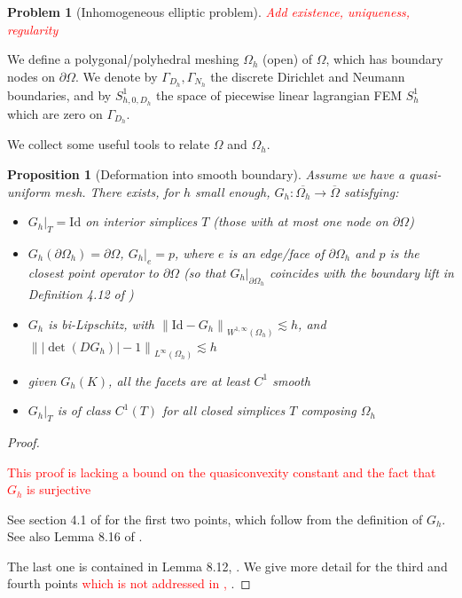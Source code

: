 \documentclass[english,a4paper,9pt,oneside]{scrbook}	%
\theoremstyle{break}
\newtheorem{prop}[equation]{Proposition}
\newtheorem{pb}[equation]{Problem}
\newenvironment{mproof}[1][\proofname]{%
  \begin{proof}[#1]$ $\par\nobreak\ignorespaces
}{%
  \end{proof}
}
\renewcommand*{\proofname}{Proof}
\theoremstyle{remark}
\newcommand{\norm}[1]{\left\lVert#1\right\rVert}
\newcommand{\id}{\text{Id}}
\begin{document}
\begin{appendices}
\begin{pb}[Inhomogeneous elliptic problem]
\textcolor{red}{Add existence, uniqueness, regularity}

\end{pb}


We define a polygonal/polyhedral meshing $\Omega_h$ (open) of $\Omega$, which has boundary nodes on $\partial \Omega$. We denote by $\Gamma_{D_h}, \Gamma_{N_h}$ the discrete Dirichlet and Neumann boundaries, and by $S^1_{h,0,D_h} $ the space of piecewise linear lagrangian FEM $S^1_h$ which are zero on $\Gamma_{D_h}$.

We collect some useful tools to relate $\Omega$ and $\Omega_h$.

\begin{prop}[Deformation into smooth boundary]
\label{prop:G_h}
Assume we have a quasi-uniform mesh. There exists, for $h$ small enough, $G_h: \overline{\Omega_h} \rightarrow \overline{\Omega}$ satisfying:

\begin{itemize}
	\item $G_h|_T = \id$ on interior simplices $T$ (those with at most one node on $\partial \Omega$)
	\item $G_h(\partial \Omega_h) = \partial \Omega$, $G_h|_e=p$, where $e$ is an edge/face of $\partial \Omega_h$ and $p$ is the closest point operator to $\partial \Omega$ (so that $G_h|_{\partial \Omega_h}$ coincides with the boundary lift in Definition 4.12 of \cite{elliott})
	\item $G_h$ is bi-Lipschitz, with $\norm{\id -G_h}_{W^{1,\infty}(\Omega_h)}\lesssim h$, and $\norm{|\det(DG_h)|-1}_{L^\infty(\Omega_h)}\lesssim h$
	\item given $G_h(K)$, all the facets are at least $C^1$ smooth
	\item $G_h|_T$ is of class $C^1(T)$ for all closed simplices $T$ composing $\Omega_h$
\end{itemize}

\end{prop}
\begin{mproof}

\textcolor{red}{This proof is lacking a bound on the quasiconvexity constant and the fact that $G_h$ is surjective}

See section 4.1 of \cite{elliott} for the first two points, which follow from the definition of $G_h$. See also Lemma 8.16 of \cite{ranner}.

The last one is contained in Lemma 8.12, \cite{ranner}. We give more detail for the third and fourth points \textcolor{red}{which is not addressed in \cite{ranner}, \cite{elliott}}.


\end{mproof}
\end{appendices}
\end{document}
